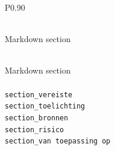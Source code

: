 \begingroup
\small
\setlength{\tabcolsep}{4pt}
\renewcommand{\arraystretch}{1.1}
\setlength{\LTcapwidth}{\textwidth}
\setlength{\LTleft}{0pt plus 1fill}
\setlength{\LTright}{0pt plus 1fill}
\begin{longtable}{P{0.90\textwidth}}
\caption{Markdown sections identified in Algoritmekader vereisten files.} \label{tab:algoritmekader-vereisten-section-fields} \\
\toprule
Markdown section \\
\midrule
\endfirsthead
\caption[]{Markdown sections identified in Algoritmekader vereisten files.} \\
\toprule
Markdown section \\
\midrule
\endhead
\midrule
{} \\
\midrule
\endfoot
\bottomrule
\endlastfoot
\texttt{section\_\allowbreak{}vereiste} \\
\texttt{section\_\allowbreak{}toelichting} \\
\texttt{section\_\allowbreak{}bronnen} \\
\texttt{section\_\allowbreak{}risico} \\
\texttt{section\_\allowbreak{}van toepassing op} \\
\end{longtable}
\endgroup

